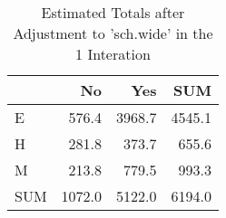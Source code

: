 \begin{table}[ht]
\centering
\caption{Estimated Totals after Adjustment to 'sch.wide' in the 1 Interation} 
\begin{tabular}{l|rr|r}
  & No & Yes & SUM \\ 
  \hline
E & 576.4 & 3968.7 & 4545.1 \\ 
  H & 281.8 & 373.7 & 655.6 \\ 
  M & 213.8 & 779.5 & 993.3 \\ 
   \hline
SUM & 1072.0 & 5122.0 & 6194.0 \\ 
  \end{tabular}
\end{table}
